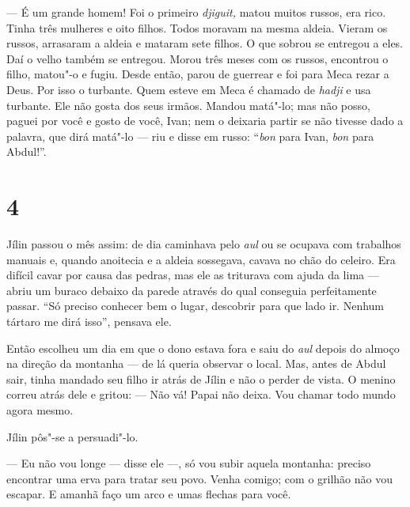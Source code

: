 --- É um grande homem! Foi o primeiro \emph{djiguit,} matou muitos
russos, era rico. Tinha três mulheres e oito filhos. Todos moravam na
mesma aldeia. Vieram os russos, arrasaram a aldeia e mataram sete
filhos. O que sobrou se entregou a eles. Daí o velho também se entregou.
Morou três meses com os russos, encontrou o filho, matou"-o e fugiu.
Desde então, parou de guerrear e foi para Meca rezar a Deus. Por isso o
turbante. Quem esteve em Meca é chamado de \emph{hadji} e usa turbante.
Ele não gosta dos seus irmãos. Mandou matá"-lo; mas não posso, paguei por
você e gosto de você, Ivan; nem o deixaria partir se não tivesse dado a
palavra, que dirá matá"-lo --- riu e disse em russo: ``\emph{bon} para
Ivan, \emph{bon} para Abdul!''.

\section{4}

Jílin passou o mês assim: de dia caminhava pelo \emph{aul} ou se ocupava
com trabalhos manuais e, quando anoitecia e a aldeia sossegava, cavava
no chão do celeiro. Era difícil cavar por causa das pedras, mas ele as
triturava com ajuda da lima --- abriu um buraco debaixo da parede
através do qual conseguia perfeitamente passar. ``Só preciso conhecer
bem o lugar, descobrir para que lado ir. Nenhum tártaro me dirá isso'',
pensava ele.

Então escolheu um dia em que o dono estava fora e saiu do \emph{aul} depois do almoço 
na direção da montanha --- de lá queria observar o local.
Mas, antes de Abdul sair, tinha mandado seu filho ir atrás de Jílin e
não o perder de vista. O menino correu atrás dele e gritou:
--- Não vá! Papai não deixa. Vou chamar todo mundo agora mesmo.

Jílin pôs"-se a persuadi"-lo.

--- Eu não vou longe --- disse ele ---, só vou subir aquela montanha:
preciso encontrar uma erva para tratar seu povo. Venha comigo; com o
grilhão não vou escapar. E amanhã faço um arco e umas flechas para você.

